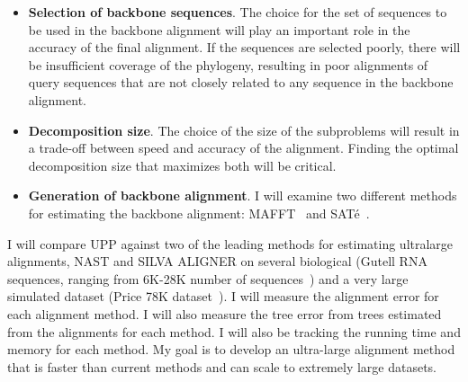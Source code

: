 \documentclass[times, 10pt]{article}
\begin{document}
\begin{itemize}
\item \textbf{Selection of backbone sequences}.  The choice for the set of sequences to be used in the backbone alignment will play an important role in the accuracy of the final alignment.  If the sequences are selected poorly, there will be insufficient coverage of the phylogeny, resulting in poor alignments of query sequences that are not closely related to any sequence in the backbone alignment.
\item \textbf{Decomposition size}.  The choice of the size of the subproblems will result in a trade-off between speed and accuracy of the alignment.  Finding the optimal decomposition size that maximizes both will be critical.
\item \textbf{Generation of backbone alignment}.  I will examine two different methods for estimating the backbone alignment: MAFFT~\cite{Katoh2002} and SAT\'{e}~\cite{Liu2012}.
\end{itemize}

I will compare UPP against two of the leading methods for estimating ultralarge alignments, NAST\cite{DeSantis2006} and SILVA ALIGNER\cite{Pruesse2007} on several biological (Gutell RNA sequences, ranging from 6K-28K number of sequences~\cite{GutellData}) and a very large simulated dataset (Price 78K dataset~\cite{Price2010}).  I will measure the alignment error for each alignment method.  I will also measure the tree error from trees estimated from the alignments for each method.  I will also be tracking the running time and memory for each method.  My goal is to develop an ultra-large alignment method that is faster than current methods and can scale to extremely large datasets.

%   
\end{document}
